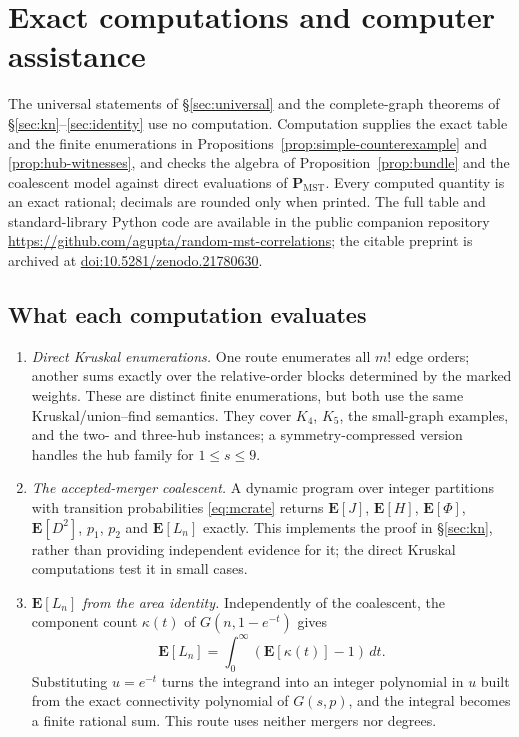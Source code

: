 \documentclass[11pt,a4paper]{amsart}
\theoremstyle{plain}
\theoremstyle{definition}
\theoremstyle{remark}
\newcommand{\PMST}{\mathbf{P}_{\mathrm{MST}}}
\newcommand{\E}{\mathbf{E}}
\begin{document}
\clearpage
\appendix

\section{Exact computations and computer assistance}
\label{sec:verification}

The universal statements of \S\ref{sec:universal} and the complete-graph
theorems of \S\ref{sec:kn}--\ref{sec:identity} use no computation. Computation
supplies the exact table and the finite enumerations in
Propositions~\ref{prop:simple-counterexample} and \ref{prop:hub-witnesses}, and
checks the algebra of Proposition~\ref{prop:bundle} and the coalescent model
against direct evaluations of $\PMST$. Every computed quantity is an exact
rational; decimals are rounded only when printed. The full table and
standard-library Python code are available in the public companion repository
\url{https://github.com/agupta/random-mst-correlations}; the citable preprint is
archived at \href{https://doi.org/10.5281/zenodo.21780630}{doi:10.5281/zenodo.21780630}.

\subsection{What each computation evaluates}

\begin{enumerate}
\item \emph{Direct Kruskal enumerations.} One route enumerates all $m!$ edge
orders; another sums exactly over the relative-order blocks determined by the
marked weights. These are distinct finite enumerations, but both use the same
Kruskal/union--find semantics. They cover $K_4$, $K_5$, the small-graph
examples, and the two- and three-hub instances; a symmetry-compressed version
handles the hub family for $1\le s\le9$.
\item \emph{The accepted-merger coalescent.} A dynamic program over integer
partitions with transition probabilities \eqref{eq:mcrate} returns $\E[J]$,
$\E[H]$, $\E[\Phi]$, $\E[D^2]$, $p_1$, $p_2$ and $\E[L_n]$ exactly. This
implements the proof in \S\ref{sec:kn}, rather than providing independent
evidence for it; the direct Kruskal computations test it in small cases.
\item \emph{$\E[L_n]$ from the area identity.} Independently of the coalescent,
the component count $\kappa(t)$ of $G(n,1-e^{-t})$ gives
\[
  \E[L_n]=\int_0^\infty(\E[\kappa(t)]-1)\,dt.
\]
Substituting $u=e^{-t}$ turns the integrand into an integer polynomial in $u$
built from the exact connectivity polynomial of $G(s,p)$, and the integral
becomes a finite rational sum. This route uses neither mergers nor degrees.
\end{enumerate}
\end{document}
